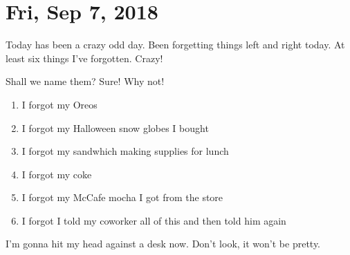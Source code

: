 \section{Fri, Sep 7, 2018}

Today has been a crazy odd day. Been forgetting things left and right today. At least
six things I've forgotten. Crazy!

Shall we name them? Sure! Why not!

\begin{enumerate}
\item I forgot my Oreos
\item I forgot my Halloween snow globes I bought
\item I forgot my sandwhich making supplies for lunch
\item I forgot my coke
\item I forgot my McCafe mocha I got from the store
\item I forgot I told my coworker all of this and then told him again
\end{enumerate}

I'm gonna hit my head against a desk now. Don't look, it won't be pretty.
